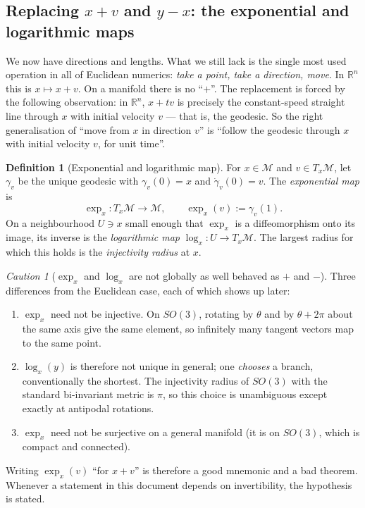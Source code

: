\documentclass[11pt,a4paper]{report}
\theoremstyle{definition}
\newtheorem{definition}[definition]{Definition}
\theoremstyle{remark}
\newtheorem{caution}[caution]{Caution}
\newcommand{\RR}{\mathbb R}
\begin{document}
\subsection{Replacing \texorpdfstring{$x+v$}{x+v} and \texorpdfstring{$y-x$}{y-x}: the exponential and logarithmic maps}

We now have directions and lengths. What we still lack is the single most
used operation in all of Euclidean numerics: \emph{take a point, take a
direction, move}. In $\RR^n$ this is $x\mapsto x+v$. On a manifold there is
no ``$+$''. The replacement is forced by the following observation: in
$\RR^n$, $x+tv$ is precisely the constant-speed straight line through $x$
with initial velocity $v$ --- that is, the geodesic. So the right
generalisation of ``move from $x$ in direction $v$'' is ``follow the geodesic
through $x$ with initial velocity $v$, for unit time''.

\begin{definition}[Exponential and logarithmic map]
\label{def:explog-scratch}
For $x\in\mathcal M$ and $v\in T_x\mathcal M$, let $\gamma_v$ be the unique
geodesic with $\gamma_v(0)=x$ and $\dot\gamma_v(0)=v$. The
\emph{exponential map} is
\[
\exp_x : T_x\mathcal M \to \mathcal M ,
\qquad
\exp_x(v) := \gamma_v(1) .
\]
On a neighbourhood $U\ni x$ small enough that $\exp_x$ is a diffeomorphism
onto its image, its inverse is the \emph{logarithmic map}
$\log_x:U\to T_x\mathcal M$. The largest radius for which this holds is the
\emph{injectivity radius} at $x$.
\end{definition}

\begin{caution}[$\exp_x$ and $\log_x$ are not globally as well behaved as $+$ and $-$]
\label{caution:explog-scope}
Three differences from the Euclidean case, each of which shows up later:
\begin{enumerate}[nosep,label=(\alph*)]
\item $\exp_x$ need not be injective. On $SO(3)$, rotating by $\theta$ and by
$\theta+2\pi$ about the same axis give the same element, so infinitely many
tangent vectors map to the same point.
\item $\log_x(y)$ is therefore not unique in general; one \emph{chooses} a
branch, conventionally the shortest. The injectivity radius of $SO(3)$ with
the standard bi-invariant metric is $\pi$, so this choice is unambiguous
except exactly at antipodal rotations.
\item $\exp_x$ need not be surjective on a general manifold (it is on $SO(3)$,
which is compact and connected).
\end{enumerate}
Writing $\exp_x(v)$ ``for $x+v$'' is therefore a good mnemonic and a bad
theorem. Whenever a statement in this document depends on invertibility, the
hypothesis is stated.
\end{caution}
\end{document}
